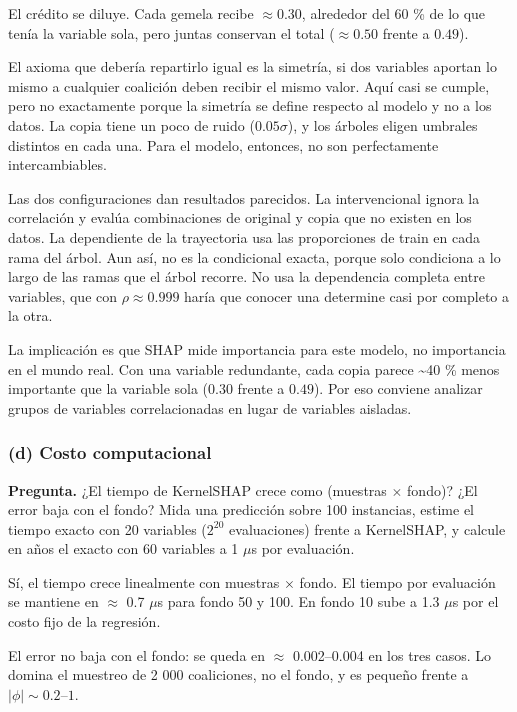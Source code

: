 \documentclass[11pt]{article}
\renewcommand{\_}{\textunderscore\allowbreak{}}
\begin{document}
El crédito se diluye. Cada gemela recibe \(\approx 0.30\), alrededor del 60 \% de lo que tenía la variable sola, pero juntas conservan el total (\(\approx 0.50\) frente a \(0.49\)).

El axioma que debería repartirlo igual es la simetría, si dos variables aportan lo mismo a cualquier coalición deben recibir el mismo valor. Aquí casi se cumple, pero no exactamente porque la simetría se define respecto al modelo y no a los datos. La copia tiene un poco de ruido (\(0.05\sigma\)), y los árboles eligen umbrales distintos en cada una. Para el modelo, entonces, no son perfectamente intercambiables.

Las dos configuraciones dan resultados parecidos. La intervencional ignora la correlación y evalúa combinaciones de original y copia que no existen en los datos. La dependiente de la trayectoria usa las proporciones de train en cada rama del árbol. Aun así, no es la condicional exacta, porque solo condiciona a lo largo de las ramas que el árbol recorre. No usa la dependencia completa entre variables, que con \(\rho \approx 0.999\) haría que conocer una determine casi por completo a la otra.

La implicación es que SHAP mide importancia para este modelo, no importancia en el mundo real. Con una variable redundante, cada copia parece \textasciitilde40 \% menos importante que la variable sola (\(0.30\) frente a \(0.49\)). Por eso conviene analizar grupos de variables correlacionadas en lugar de variables aisladas.

\subsubsection*{(d) Costo computacional}
\begin{tcolorbox}[colback=yellow!12, colframe=orange!70!black, boxrule=0.5pt, left=4pt, right=4pt]
\textbf{Pregunta.} ¿El tiempo de KernelSHAP crece como (muestras \(\times\) fondo)? ¿El error baja con el fondo? Mida una predicción sobre 100 instancias, estime el tiempo exacto con 20 variables (\(2^{20}\) evaluaciones) frente a KernelSHAP, y calcule en años el exacto con 60 variables a 1 \(\mu\)s por evaluación.
\end{tcolorbox}

Sí, el tiempo crece linealmente con muestras \(\times\) fondo. El tiempo por evaluación se mantiene en \(\approx\) 0.7 \(\mu\)s para fondo 50 y 100. En fondo 10 sube a 1.3 \(\mu\)s por el costo fijo de la regresión.

El error no baja con el fondo: se queda en \(\approx\) 0.002--0.004 en los tres casos. Lo domina el muestreo de 2 000 coaliciones, no el fondo, y es pequeño frente a \(|\phi| \sim 0.2\)--\(1\).
\end{document}
